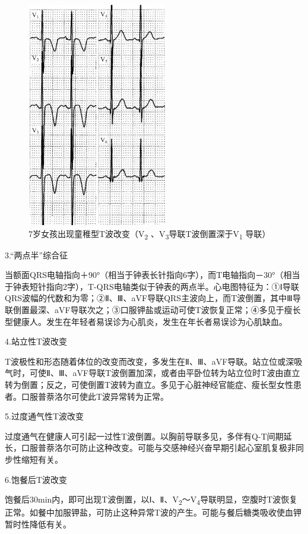 \begin{figure}[!htbp]
 \centering
 \includegraphics[width=2.40625in,height=3.86458in]{./images/Image00097.jpg}
 \captionsetup{justification=centering}
 \caption{7岁女孩出现童稚型T波改变（V\textsubscript{2} 、V\textsubscript{3}导联T波倒置深于V\textsubscript{1} 导联）}
 \label{fig6-5}
  \end{figure} 


3.“两点半”综合征

当额面QRS电轴指向＋90°（相当于钟表长针指向6字），而T电轴指向－30°（相当于钟表短针指向2字），T-QRS电轴类似于钟表的两点半。心电图特征为：①Ⅰ导联QRS波幅的代数和为零；②Ⅱ、Ⅲ、aVF导联QRS主波向上，而T波倒置，其中Ⅲ导联倒置最深、aVF导联次之；③口服钾盐或运动可使T波恢复正常；④多见于瘦长型健康人。发生在年轻者易误诊为心肌炎，发生在年长者易误诊为心肌缺血。

4.站立性T波改变

T波极性和形态随着体位的改变而改变，多发生在Ⅱ、Ⅲ、aVF导联。站立位或深吸气时，可使Ⅱ、Ⅲ、aVF导联T波倒置加深，或者由平卧位转为站立位时T波由直立转为倒置；反之，可使倒置T波转为直立。多见于心脏神经官能症、瘦长型女性患者。口服普萘洛尔可使此T波异常转为正常。

5.过度通气性T波改变

过度通气在健康人可引起一过性T波倒置。以胸前导联多见，多伴有Q-T间期延长，口服普萘洛尔可防止这种改变。可能与交感神经兴奋早期引起心室肌复极非同步性缩短有关。

6.饱餐后T波改变

饱餐后30min内，即可出现T波倒置，以Ⅰ、Ⅱ、V\textsubscript{2}～V\textsubscript{4}导联明显，空腹时T波恢复正常。如餐中加服钾盐，可防止这种异常T波的产生。可能与餐后糖类吸收使血钾暂时性降低有关。

